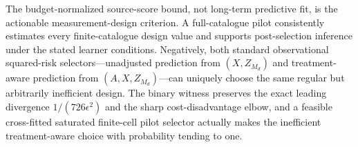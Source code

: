 The budget-normalized source-score bound, not long-term predictive fit, is the actionable measurement-design criterion.  A full-catalogue pilot consistently estimates every finite-catalogue design value and supports post-selection inference under the stated learner conditions.  Negatively, both standard observational squared-risk selectors---unadjusted prediction from \((X,Z_{M_d})\) and treatment-aware prediction from \((A,X,Z_{M_d})\)---can uniquely choose the same regular but arbitrarily inefficient design.  The binary witness preserves the exact leading divergence \(1/(726\epsilon^2)\) and the sharp cost-disadvantage elbow, and a feasible cross-fitted saturated finite-cell pilot selector actually makes the inefficient treatment-aware choice with probability tending to one.